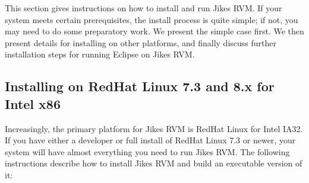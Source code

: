  This section gives instructions on how to install and run Jikes RVM.
If your system meets certain prerequisites, the install process is
quite simple; if not, you may need to do some preparatory work.  We
present the simple case first.  We then present details for installing
on other platforms, and finally discuss further installation steps for
running Eclipse on Jikes RVM.

\subsection{Installing on RedHat Linux 7.3 and 8.x for Intel x86}

 Increasingly, the primary platform for Jikes RVM is RedHat Linux for
Intel IA32.  If you have either a developer or full install of RedHat
Linux 7.3 or newer, your system will have almost everything you need
to run Jikes RVM.  The following instructions describe how to install
Jikes RVM and build an executable version of it:
